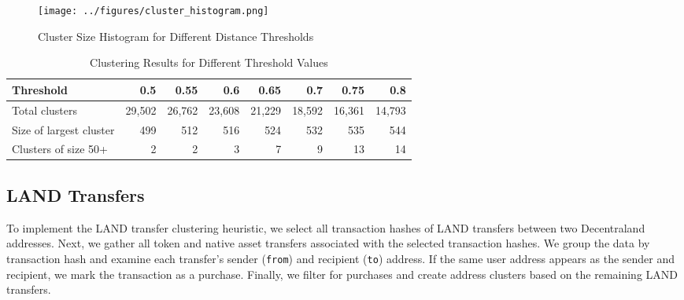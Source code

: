 \documentclass[12pt,a4paper,titlepage,oneside,english]{article}
\begin{document}
\begin{figure}[h!]
	\centering
	\texttt{[image: ../figures/cluster\_histogram.png]}
	\caption{Cluster Size Histogram for Different Distance Thresholds}
	\label{fig:threshold_sensitivity}
\end{figure}


\begin{table}[h!]
\scriptsize
  \centering
  \begin{tabular}{lrrrrrrr}
    \hline
	\textbf{Threshold} & \textbf{0.5} & \textbf{0.55} &\textbf{0.6} & \textbf{0.65} & \textbf{0.7} & \textbf{0.75} & \textbf{0.8} \\
	\hline
Total clusters 			& 29,502 & 26,762 & 23,608 & 21,229 & 18,592 & 16,361 & 14,793 \\
Size of largest cluster & 499 & 	512 & 516 & 	524 & 532 & 535 & 544\\
Clusters of size 50+ 	& 2 & 2 & 3 & 7 & 9  & 13 & 14\\
    \hline
  \end{tabular}
  \caption{Clustering Results for Different Threshold Values}
  \label{tbl:cluster_table}
\end{table}

\subsection{LAND Transfers}
To implement the LAND transfer clustering heuristic, we select all transaction hashes of LAND transfers between two Decentraland addresses. Next, we gather all token and native asset transfers associated with the selected transaction hashes. We group the data by transaction hash and examine each transfer's sender (\texttt{from}) and recipient (\texttt{to}) address. If the same user address appears as the sender and recipient, we mark the transaction as a purchase. Finally, we filter for purchases and create address clusters based on the remaining LAND transfers.
\end{document}
